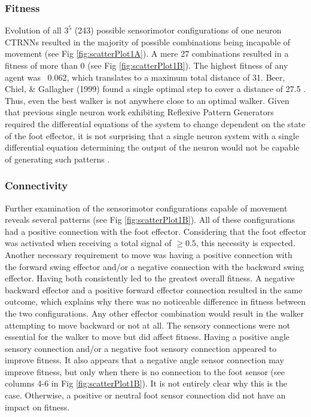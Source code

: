 \documentclass{article}
\begin{document}
\subsubsection{Fitness}
Evolution of all \(3^5\) (243) possible sensorimotor configurations of one neuron CTRNNs resulted in the majority of possible combinations being incapable of movement (see Fig \ref{fig:scatterPlot1A}). A mere 27 combinations resulted in a fitness of more than 0 (see Fig \ref{fig:scatterPlot1B}). The highest fitness of any agent was ~0.062, which translates to a maximum total distance of 31. Beer, Chiel, \& Gallagher (1999) found a single optimal step to cover a distance of 27.5 \cite{BeerOptimal}. Thus, even the best walker is not anywhere close to an optimal walker. Given that previous single neuron work exhibiting Reflexive Pattern Generators required the differential equations of the system to change dependent on the state of the foot effector, it is not surprising that a single neuron system with a single differential equation determining the output of the neuron would not be capable of generating such patterns \cite{BeerRPG}. 

\subsubsection{Connectivity}

Further examination of the sensorimotor configurations capable of movement reveals several patterns (see Fig \ref{fig:scatterPlot1B}). All of these configurations had a positive connection with the foot effector. Considering that the foot effector was activated when receiving a total signal of \(\geq 0.5\), this necessity is expected. Another necessary requirement to move was having a positive connection with the forward swing effector and/or a negative connection with the backward swing effector. Having both consistently led to the greatest overall fitness. A negative backward effector and a positive forward effector connection resulted in the same outcome, which explains why there was no noticeable difference in fitness between the two configurations. Any other effector combination would result in the walker attempting to move backward or not at all. 
The sensory connections were not essential for the walker to move but did affect fitness. Having a positive angle sensory connection and/or a negative foot sensory connection appeared to improve fitness.  
It also appears that a negative angle sensor connection may improve fitness, but only when there is no connection to the foot sensor (see columns 4-6 in Fig \ref{fig:scatterPlot1B}). It is not entirely clear why this is the case. Otherwise, a positive or neutral foot sensor connection did not have an impact on fitness.
\end{document}
